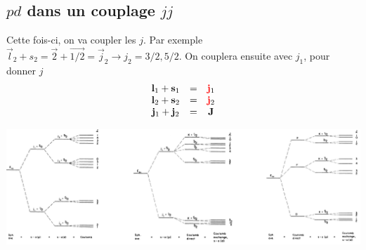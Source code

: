 \subsection{$pd$ dans un couplage $jj$}
Cette fois-ci, on va coupler les $j$. Par exemple $\vec l_2+s_2= \vec 2 + \vec{1/2} =\vec j_2 \to
j_2=3/2,5/2$. On couplera ensuite avec $j_1$, pour donner $j$
\begin{equation}
\begin{array}{ccc}
{\bf l}_1 +   {\bf  s}_1  & = & {\color{red}{\bf  j}}_1 \\
{\bf l}_2 +   {\bf  s}_2  & = & {\color{red}{\bf  j}}_2 \\
{\bf j}_1 +   {\bf  j}_2  & = & {\bf  J}
\end{array}
\end{equation}

\begin{center}
	\includegraphics[scale=0.4]{ch1/image12}
\end{center}

